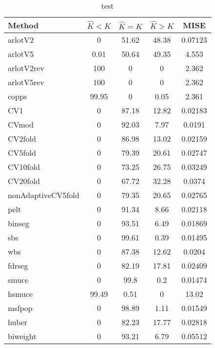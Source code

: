 \begin{table}[ht]
\centering
\begin{tabular}{l|cccc}
  \hline
Method & $\hat{K} < K$ & $\hat{K} = K$ & $\hat{K} > K$ & MISE \\ 
  \hline
arlotV2 &     0 & 51.62 & 48.38 & 0.07123 \\ 
  arlotV5 &  0.01 & 50.64 & 49.35 & 4.553 \\ 
  arlotV2rev &   100 &     0 &     0 & 2.362 \\ 
  arlotV5rev &   100 &     0 &     0 & 2.362 \\ 
  copps & 99.95 &     0 &  0.05 & 2.361 \\ 
  CV1 &     0 & 87.18 & 12.82 & 0.02183 \\ 
  CVmod &     0 & 92.03 &  7.97 & 0.0191 \\ 
  CV2fold &     0 & 86.98 & 13.02 & 0.02159 \\ 
  CV5fold &     0 & 79.39 & 20.61 & 0.02747 \\ 
  CV10fold &     0 & 73.25 & 26.75 & 0.03249 \\ 
  CV20fold &     0 & 67.72 & 32.28 & 0.0374 \\ 
  nonAdaptiveCV5fold &     0 & 79.35 & 20.65 & 0.02765 \\ 
  pelt &     0 & 91.34 &  8.66 & 0.02118 \\ 
  binseg &     0 & 93.51 &  6.49 & 0.01869 \\ 
  sbs &     0 & 99.61 &  0.39 & 0.01495 \\ 
  wbs &     0 & 87.38 & 12.62 & 0.0204 \\ 
  fdrseg &     0 & 82.19 & 17.81 & 0.02409 \\ 
  smuce &     0 &  99.8 &   0.2 & 0.01474 \\ 
  hsmuce & 99.49 &  0.51 &     0 & 13.02 \\ 
  msfpop &     0 & 98.89 &  1.11 & 0.01549 \\ 
  huber &     0 & 82.23 & 17.77 & 0.02818 \\ 
  biweight &     0 & 93.21 &  6.79 & 0.05512 \\ 
   \hline
\end{tabular}
\caption{test} 
\end{table}
